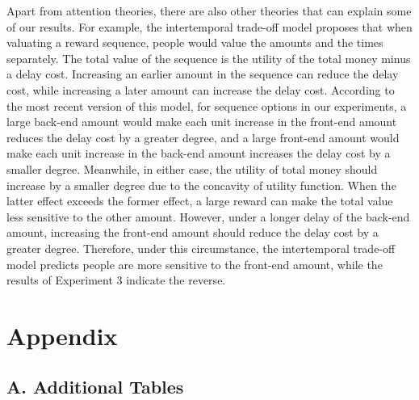 \documentclass[
  12pt,
]{article}
\begin{document}
Apart from attention theories, there are also other theories that can
explain some of our results. For example, the intertemporal trade-off
model
\citep{read2012tradeoffs, scholten2016cumulative, scholten2024unified}
proposes that when valuating a reward sequence, people would value the
amounts and the times separately. The total value of the sequence is the
utility of the total money minus a delay cost. Increasing an earlier
amount in the sequence can reduce the delay cost, while increasing a
later amount can increase the delay cost. According to the most recent
version of this model, for sequence options in our experiments, a large
back-end amount would make each unit increase in the front-end amount
reduces the delay cost by a greater degree, and a large front-end amount
would make each unit increase in the back-end amount increases the delay
cost by a smaller degree. Meanwhile, in either case, the utility of
total money should increase by a smaller degree due to the concavity of
utility function. When the latter effect exceeds the former effect, a
large reward can make the total value less sensitive to the other
amount. However, under a longer delay of the back-end amount, increasing
the front-end amount should reduce the delay cost by a greater degree.
Therefore, under this circumstance, the intertemporal trade-off model
predicts people are more sensitive to the front-end amount, while the
results of Experiment 3 indicate the reverse.

\renewcommand\refname{References}
  

\newpage
\renewcommand\thefigure{B.\arabic{figure}}    
\setcounter{figure}{0}

\renewcommand\thetable{A.\arabic{table}}    
\setcounter{table}{0}

\hypertarget{appendix}{%
\section*{Appendix}\label{appendix}}

\hypertarget{a.-additional-tables}{%
\subsection*{A. Additional Tables}\label{a.-additional-tables}}




\end{document}
